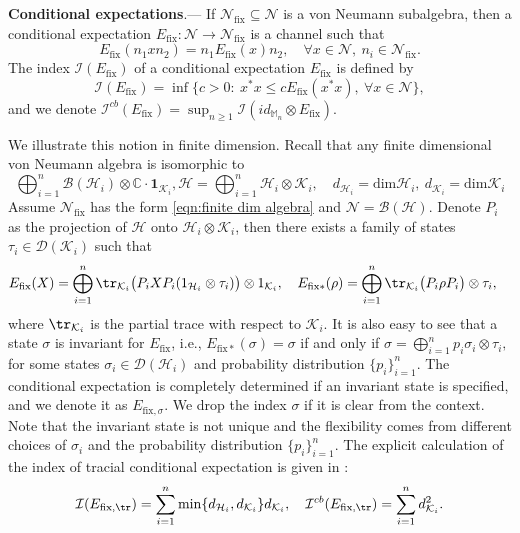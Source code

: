 \documentclass[11pt,reqno]{amsart}
\numberwithin{equation}{section}
\newcommand{\mb}{\mathbb}
\newcommand{\mc}{\mathcal}
\newcommand{\fix}{\mathrm{fix}}
\begin{document}
\textbf{Conditional expectations}.--- If $\mc N_{\fix} \subseteq \mc N$ is a von Neumann subalgebra, then a conditional expectation $E_{\fix}: \mc N \to \mc N_{\fix}$ is a channel such that 
\begin{equation}
    E_{\fix}(n_1 x n_2) = n_1 E_{\fix}(x) n_2,\quad \forall x \in \mc N,\ n_i \in \mc N_{\fix}.
\end{equation}
The index $\mc I(E_{\fix})$ of a conditional expectation $E_{\fix}$ is defined by 
\begin{equation}\label{def:index}
    \mc I(E_{\fix}) = \inf\{c>0:\ x^* x \le  c E_{\fix}(x^*x),\ \forall x \in \mc N\},
\end{equation}
and we denote $\mc I^{cb}(E_{\fix}) = \sup_{n\ge 1} \mc I(id_{\mb M_n} \otimes E_{\fix})$.

We illustrate this notion in finite dimension. Recall that any finite dimensional von Neumann algebra is isomorphic to 
\begin{equation}\label{eqn:finite dim algebra}
\bigoplus_{i=1}^n\mc B(\mc H_i)\otimes \mb C\cdot\textbf{1}_{\mc K_i}, \mc H = \bigoplus_{i=1}^n \mc H_i \otimes \mc K_i,\quad d_{\mc H_i} = \text{dim} \mc H_i,\ d_{\mc K_i} = \text{dim} \mc K_i
\end{equation}
Assume $\mc N_{\fix}$ has the form \eqref{eqn:finite dim algebra} and $\mc N = \mc B(\mc H)$. Denote $P_i$ as the projection of $\mc H$ onto $\mc H_i\otimes \mc K_i$, then there exists a family of states $\tau_i \in \mc D(\mc K_i)$ such that 
\begin{align}\label{eqn:form of conditional expectation}
& E_{\fix}(X) = \bigoplus_{i=1}^n \tr_{\mc K_i}\big(P_iXP_i(1_{\mc H_i}\otimes \tau_i) \big) \otimes 1_{\mc K_i}, \quad E_{\fix*}(\rho) = \bigoplus_{i=1}^n \tr_{\mc K_i}\big(P_i \rho P_i\big) \otimes \tau_i,
\end{align}
where $\tr_{\mc K_i}$ is the partial trace with respect to $\mc K_i$. It is also easy to see that a state $\sigma$ is invariant for $E_{\fix}$, i.e., $E_{\fix*}(\sigma) = \sigma$ if and only if $
\sigma = \bigoplus_{i=1}^n p_i \sigma_i\otimes \tau_i,$ for some states $\sigma_i \in \mc D(\mc H_i)$ and probability distribution $\{p_i\}_{i=1}^n$. The conditional expectation is completely determined if an invariant state is specified, and we denote it as $E_{\fix,\sigma}$. We drop the index $\sigma$ if it is clear from the context. Note that the invariant state is not unique and the flexibility comes from different choices of $\sigma_i$ and the probability distribution $\{p_i\}_{i=1}^n$. The explicit calculation of the index of tracial conditional expectation is given in \cite{GJL20entropy}:
\begin{align}
\mc I(E_{\fix,\tr}) = \sum_{i=1}^n\min\{d_{\mc H_i}, d_{\mc K_i}\}d_{\mc K_i},\quad \mc I^{cb}(E_{\fix,\tr}) =\sum_{i=1}^n d_{\mc K_i}^2.
\end{align}
\end{document}
